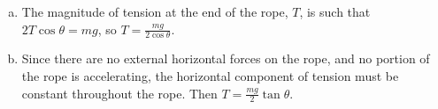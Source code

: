 \documentclass{esg8012pset}
\begin{document}
\begin{solution}
  \begin{enumerate}[a)]
    \item The magnitude of tension at the end of the rope, $T$, is such that $2T\cos\theta = mg$, so $T = \frac{mg}{2\cos\theta}$.
    \item Since there are no external horizontal forces on the rope, and no portion of the rope is accelerating, the horizontal component of tension must be constant throughout the rope.  Then $T = \frac{mg}{2}\tan\theta$. %
  \end{enumerate}
\end{solution}
\end{document}
